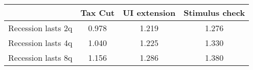 \begin{tabular}{@{}lccc@{}} 
\toprule 
& Tax Cut    & UI extension    & Stimulus check    \\  \midrule 
Recession lasts 2q &0.978  & 1.219  & 1.276     \\ 
Recession lasts 4q &1.040  & 1.225  & 1.330     \\ 
Recession lasts 8q &1.156  & 1.286  & 1.380     \\ 
\end{tabular}  
